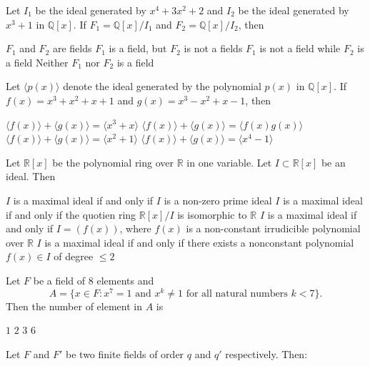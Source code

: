 \documentclass[10pt]{exam}
\begin{document}
\begin{questions}
\question
Let $I_1$ be the ideal generated by $x^4+3x^2+2$ and $I_2$ be the ideal generated by $x^3+1$ in $\mathbb{Q}[x]$. If $F_1=\mathbb{Q}[x]/I_1$ and $F_2=\mathbb{Q}[x]/I_2$, then 

\begin{choices}
\choice $F_1$ and $F_2$ are fields
\choice $F_1$ is a field, but $F_2$ is not a fields
\choice $F_1$ is not a field while $F_2$ is a field
\choice Neither $F_1$ nor $F_2$ is a field
\end{choices}

\question
Let $\langle p(x)\rangle$ denote the ideal generated by the polynomial $p(x)$ in $\mathbb{Q}[x]$. If $f(x)=x^3+x^2+x+1$ and $g(x)=x^3-x^2+x-1$, then

\begin{checkboxes}
\choice $\langle f(x) \rangle+ \langle g(x)\rangle=\langle x^3+x \rangle $
\choice $\langle f(x) \rangle+ \langle g(x)\rangle=\langle f(x)g(x)\rangle$
\choice $\langle f(x) \rangle+ \langle g(x)\rangle=\langle x^2+1 \rangle$
\choice $\langle f(x) \rangle+ \langle g(x)\rangle =\langle x^4-1 \rangle$
\end{checkboxes}


\question
Let $\mathbb{R}[x]$ be the polynomial ring over $\mathbb{R}$ in one variable. Let $I \subset \mathbb{R}[x]$ be an ideal. Then

\begin{checkboxes}
\choice $I$ is a maximal ideal if and only if $I$ is a non-zero prime ideal
\choice $I$ is a maximal ideal if and only if the quotien ring $\mathbb{R}[x]/I$ is isomorphic to $\mathbb{R}$
\choice $I$ is a maximal ideal if and only if $I = (f(x))$, where $f(x)$ is a non-constant irrudicible polynomial over $\mathbb{R}$
\choice $I$ is a maximal ideal if  and only if there exists a nonconstant polynomial  $f(x) \in I $ of degree $\leq 2$
\end{checkboxes}


\question
Let $F$ be a field of $8$ elements and $$A=\{x \in F : x^7=1 \text{ and } x^k \neq 1 \text{ for all natural numbers } k <7\}.$$ Then the number of element in $A$ is 

\begin{oneparchoices}
\choice $1$
\choice $2$
\choice $3$
\choice $6$  
\end{oneparchoices}

\question
Let $F$ and $F'$ be two finite fields of order $q$ and $q'$ respectively. Then:


\end{questions}
\end{document}
